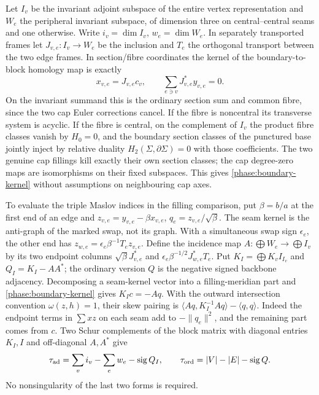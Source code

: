 Let \(I_v\) be the invariant adjoint subspace of the entire vertex representation and \(W_e\) the peripheral invariant subspace, of dimension three on central--central seams and one otherwise. Write \(i_v=\dim I_v\), \(w_e=\dim W_e\). In separately transported frames let \(J_{v,e}:I_v\to W_e\) be the inclusion and \(T_e\) the orthogonal transport between the two edge frames. In section/fibre coordinates the kernel of the boundary-to-block homology map is exactly
\begin{equation}
 x_{v,e}=J_{v,e}c_v,\qquad
 \sum_{e\ni v}J_{v,e}^* y_{v,e}=0 .
 \label{phase:boundary-kernel}
\end{equation}
On the invariant summand this is the ordinary section sum and common fibre, since the two cap Euler corrections cancel. If the fibre is noncentral its transverse system is acyclic. If the fibre is central, on the complement of \(I_v\) the product fibre classes vanish by \(H_0=0\), and the boundary section classes of the punctured base jointly inject by relative duality \(H_2(\Sigma,\partial\Sigma)=0\) with those coefficients. The two genuine cap fillings kill exactly their own section classes; the cap degree-zero maps are isomorphisms on their fixed subspaces. This gives \eqref{phase:boundary-kernel} without assumptions on neighbouring cap axes.

To evaluate the triple Maslov indices in the filling comparison, put \(\beta=b/a\) at the first end of an edge and
\(z_{v,e}=y_{v,e}-\beta x_{v,e}\), \(q_e=z_{v,e}/\sqrt\beta\). The seam kernel is the anti-graph of the marked swap, not its graph. With a simultaneous swap sign \(\epsilon_e\), the other end has \(z_{w,e}=\epsilon_e\beta^{-1}T_e z_{v,e}\). Define the incidence map \(A:\bigoplus W_e\to\bigoplus I_v\) by its two endpoint columns \(\sqrt\beta J_{v,e}^*\) and \(\epsilon_e \beta^{-1/2}J_{w,e}^*T_e\). Put \(K_I=\bigoplus K_v I_{I_v}\) and \(Q_I=K_I-AA^*\); the ordinary version \(Q\) is the negative signed backbone adjacency. Decomposing a seam-kernel vector into a filling-meridian part and \eqref{phase:boundary-kernel} gives \(K_I c=-Aq\). With the outward intersection convention \(\omega(z,h)=1\), their skew pairing is
\(\langle Aq,K_I^{-1}Aq\rangle-\langle q,q\rangle\).
Indeed the endpoint terms in \(\sum x z\) on each seam add to \(-\lVert q_e\rVert^2\), and the remaining part comes from \(c\). Two Schur complements of the block matrix with diagonal entries \(K_I,I\) and off-diagonal \(A,A^*\) give
\[
 \tau_{\rm ad}=\sum_v i_v-\sum_e w_e-\operatorname{sig}Q_I,\qquad
 \tau_{\rm ord}=|V|-|E|-\operatorname{sig}Q .
\]
No nonsingularity of the last two forms is required.

